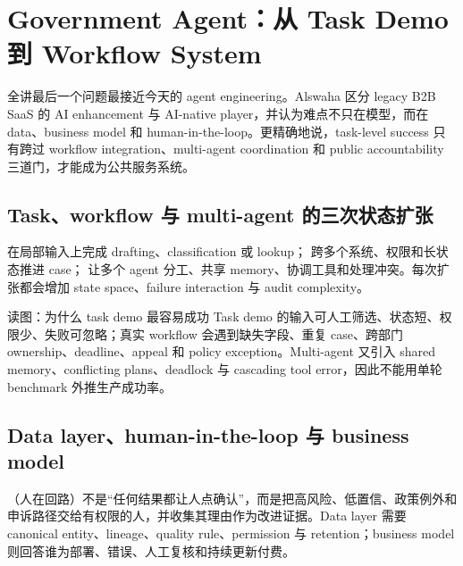 \section{Government Agent：从 Task Demo 到 Workflow System}

全讲最后一个问题最接近今天的 agent engineering。Alswaha 区分 legacy B2B SaaS 的 AI enhancement 与 AI-native player，并认为难点不只在模型，而在 data、business model 和 human-in-the-loop。更精确地说，task-level success 只有跨过 workflow integration、multi-agent coordination 和 public accountability 三道门，才能成为公共服务系统。

\subsection{Task、workflow 与 multi-agent 的三次状态扩张}

 在局部输入上完成 drafting、classification 或 lookup； 跨多个系统、权限和长状态推进 case； 让多个 agent 分工、共享 memory、协调工具和处理冲突。每次扩张都会增加 state space、failure interaction 与 audit complexity。


\begin{knowledgebox}{读图：为什么 task demo 最容易成功}
Task demo 的输入可人工筛选、状态短、权限少、失败可忽略；真实 workflow 会遇到缺失字段、重复 case、跨部门 ownership、deadline、appeal 和 policy exception。Multi-agent 又引入 shared memory、conflicting plans、deadlock 与 cascading tool error，因此不能用单轮 benchmark 外推生产成功率。
\end{knowledgebox}

\subsection{Data layer、human-in-the-loop 与 business model}

（人在回路）不是“任何结果都让人点确认”，而是把高风险、低置信、政策例外和申诉路径交给有权限的人，并收集其理由作为改进证据。Data layer 需要 canonical entity、lineage、quality rule、permission 与 retention；business model 则回答谁为部署、错误、人工复核和持续更新付费。

